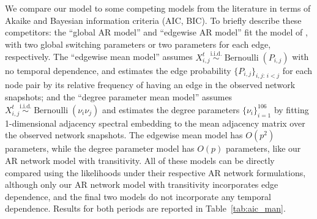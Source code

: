\documentclass[12pt]{article}
\newcommand{\0}{{\bf 0}}
\begin{document}
We compare our model to some competing models from the literature in terms of Akaike and Bayesian information criteria (AIC, BIC). 
To briefly describe these competitors: the ``global AR model'' and ``edgewise AR model'' fit the model of \cite{Jiang2023}, with two global switching parameters or two parameters for each edge, respectively.  
The ``edgewise mean model'' assumes 
$
    X_{i,j}^t \overset{\mathrm{i.i.d.}}{\sim} \operatorname{Bernoulli}(P_{i,j})
$
with no temporal dependence, and estimates the edge probability $\{P_{i,j}\}_{i,j:\,i<j}$ for each node pair by its relative frequency of having an edge in the observed network snapshots; and the ``degree parameter mean model'' 
assumes 
$
    X_{i,j}^t \overset{\mathrm{i.i.d.}}{\sim} \operatorname{Bernoulli}(\nu_i\nu_j)
$
and estimates the degree parameters $\{\nu_i\}_{i=1}^{106}$ by fitting 1-dimensional adjacency spectral embedding \citep{Athreya2017} to the mean adjacency matrix over the observed network snapshots. 
The edgewise mean model has $O(p^2)$ parameters, while the degree parameter model has $O(p)$ parameters, like our AR network model with transitivity.
All of these models can be directly compared using the likelihoods under their respective AR network formulations, although only our AR network model with transitivity incorporates edge dependence, and the final two models do not incorporate any temporal dependence. 
Results for both periods are reported in Table~\ref{tab:aic_man}.
\end{document}
